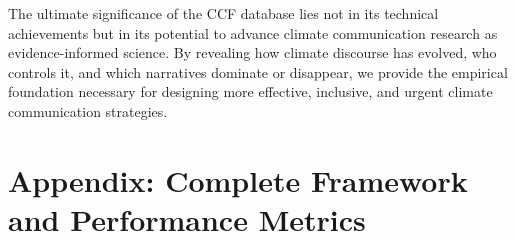 \documentclass[12pt]{article}
\begin{document}
The ultimate significance of the CCF database lies not in its technical achievements but in its potential to advance climate communication research as evidence-informed science. By revealing how climate discourse has evolved, who controls it, and which narratives dominate or disappear, we provide the empirical foundation necessary for designing more effective, inclusive, and urgent climate communication strategies. 

\appendix
\setcounter{table}{0}  %
\renewcommand{\thetable}{A\arabic{table}}  %
\renewcommand\theHtable{Appendix.\thetable}  %

\landscape
\section{Appendix: Complete Framework and Performance Metrics}
\label{sec:appendix}
\end{document}
